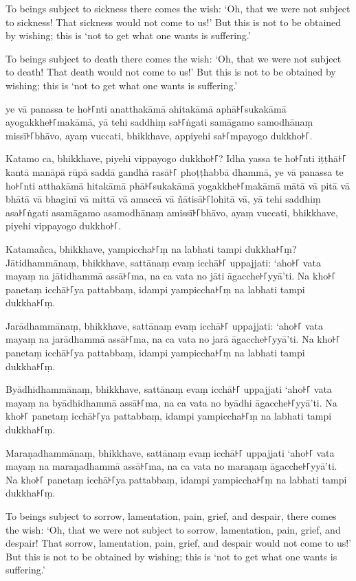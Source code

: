 To beings subject to sickness there comes the wish: `Oh, that we were not
subject to sickness! That sickness would not come to us!' But this is not to be
obtained by wishing; this is `not to get what one wants is suffering.'

To beings subject to death there comes the wish: `Oh, that we were not subject
to death! That death would not come to us!' But this is not to be obtained by
wishing; this is `not to get what one wants is suffering.'

\paliPage

ye vā panassa te ho꜔꜒nti anatthakāmā ahitakāmā aphā꜔꜒sukakāmā ayogakkhe꜔꜒makāmā, yā
tehi saddhiṃ sa꜔꜒ṅgati samāgamo samodhānaṃ missī꜔꜒bhāvo, ayaṃ vuccati, bhikkhave,
appiyehi sa꜔꜒mpayogo dukkho꜔꜒.

Katamo ca, bhikkhave, piyehi vippayogo dukkho꜔꜒? Idha yassa te ho꜔꜒nti iṭṭhā꜔꜒ kantā
manāpā rūpā saddā gandhā rasā꜔꜒ phoṭṭhabbā dhammā, ye vā panassa te ho꜔꜒nti
atthakāmā hitakāmā phā꜔꜒sukakāmā yogakkhe꜔꜒makāmā mātā vā pitā vā bhātā vā bhaginī
vā mittā vā amaccā vā ñātisā꜔꜒lohitā vā, yā tehi saddhiṃ asa꜔꜒ṅgati asamāgamo
asamodhānaṃ amissī꜔꜒bhāvo, ayaṃ vuccati, bhikkhave, piyehi vippayogo dukkho꜔꜒.

Katamañca, bhikkhave, yampiccha꜔꜒ṃ na labhati tampi dukkha꜔꜒ṃ? Jātidhammānaṃ,
bhikkhave, sattānaṃ evaṃ icchā꜔꜒ uppajjati: ‘aho꜔꜒ vata mayaṃ na jātidhammā assā꜔꜒ma,
na ca vata no jāti āgacche꜔꜒yyā’ti. Na kho꜔꜒ panetaṃ icchā꜔꜒ya pattabbaṃ, idampi
yampiccha꜔꜒ṃ na labhati tampi dukkha꜔꜒ṃ.

Jarādhammānaṃ, bhikkhave, sattānaṃ evaṃ icchā꜔꜒ uppajjati: ‘aho꜔꜒ vata mayaṃ na
jarādhammā assā꜔꜒ma, na ca vata no jarā āgacche꜔꜒yyā’ti. Na kho꜔꜒ panetaṃ icchā꜔꜒ya
pattabbaṃ, idampi yampiccha꜔꜒ṃ na labhati tampi dukkha꜔꜒ṃ.

Byādhidhammānaṃ, bhikkhave, sattānaṃ evaṃ icchā꜔꜒ uppajjati ‘aho꜔꜒ vata mayaṃ na
byādhidhammā assā꜔꜒ma, na ca vata no byādhi āgacche꜔꜒yyā’ti. Na kho꜔꜒ panetaṃ icchā꜔꜒ya
pattabbaṃ, idampi yampiccha꜔꜒ṃ na labhati tampi dukkha꜔꜒ṃ.

Maraṇadhammānaṃ, bhikkhave, sattānaṃ evaṃ icchā꜔꜒ uppajjati ‘aho꜔꜒ vata mayaṃ na
maraṇadhammā assā꜔꜒ma, na ca vata no maraṇaṃ āgacche꜔꜒yyā’ti. Na kho꜔꜒ panetaṃ icchā꜔꜒ya
pattabbaṃ, idampi yampiccha꜔꜒ṃ na labhati tampi dukkha꜔꜒ṃ.

\englishPage

To beings subject to sorrow, lamentation, pain, grief, and despair, there comes
the wish: `Oh, that we were not subject to sorrow, lamentation, pain, grief, and
despair! That sorrow, lamentation, pain, grief, and despair would not come to
us!' But this is not to be obtained by wishing; this is `not to get what one
wants is suffering.'

